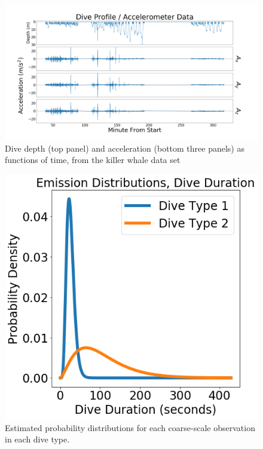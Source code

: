 
\begin{figure}[ht]
	\centering
	\includegraphics[width=5in]{../Plots/raw_data.png}
	\caption{Dive depth (top panel) and acceleration (bottom three panels) as functions of time, from the killer whale data set}
	\label{fig:data}
\end{figure}

\begin{figure}[ht]
	\centering
	\includegraphics[width=5in]{../Plots/CarHHMM2-coarse-emissions.png}
	\caption{Estimated probability distributions for each coarse-scale observation in each dive type.}
	\label{fig:coarse_emis}
\end{figure}

